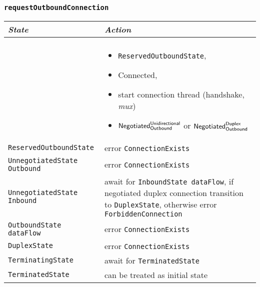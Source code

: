 \documentclass{article}
\def\InitialState{\textbullet}
\def\ReservedOutboundState{\texttt{ReservedOutboundState}}
\def\UnnegotiatedStateOut{\texttt{UnnegotiatedState Outbound}}
\def\UnnegotiatedStateIn{\texttt{UnnegotiatedState Inbound}}
\def\OutboundStateAny{\texttt{OutboundState dataFlow}}
\def\DuplexState{\texttt{DuplexState}}
\def\InboundStateAny{\texttt{InboundState dataFlow}}
\def\TerminatingState{\texttt{TerminatingState}}
\def\TerminatedState{\texttt{TerminatedState}}
\def\Connected{\textsf{Connected}}
\def\NegotiatedUniOut{$\text{\textsf{Negotiated}}^\text{\textsf{Unidirectional}}_\text{\textsf{Outbound}}$}
\def\NegotiatedDupOut{$\text{\textsf{Negotiated}}^\text{\textsf{Duplex}}_\text{\textsf{Outbound}}$}
\def\mux{\textit{mux}}
\begin{document}
\subsubsection{\texttt{requestOutboundConnection}}\label{sub:includeOutboundConnect}
\begin{tabular}[h]{ll}
  \textit{State}           & \textit{Action} \\\hline\\[2pt]
  \InitialState{}          &
    \begin{minipage}[t]{8cm}
      \begin{itemize}
        \item \ReservedOutboundState{},
        \item \Connected{},
        \item start connection thread (handshake, \mux{})
        \item \NegotiatedUniOut{} or \NegotiatedDupOut{}
      \end{itemize}
    \end{minipage}
    \vspace{8pt}\\
  \ReservedOutboundState{} & error \texttt{ConnectionExists} \\[8pt]
  \UnnegotiatedStateOut{}  & error \texttt{ConnectionExists} \\[8pt]
  \UnnegotiatedStateIn{  } &
    \begin{minipage}[t]{7cm}
      await for \InboundStateAny{}, if negotiated duplex connection
      transition to \DuplexState{}, otherwise error
      \texttt{ForbiddenConnection}
    \end{minipage}
    \vspace{8pt}\\
  \OutboundStateAny{}      & error \texttt{ConnectionExists} \\[8pt]
  \DuplexState{}           & error \texttt{ConnectionExists} \\[8pt]
  \TerminatingState{}      & await for \TerminatedState{}    \\[8pt]
  \TerminatedState{}       & can be treated as initial state \\[8pt]
\end{tabular}
\end{document}
